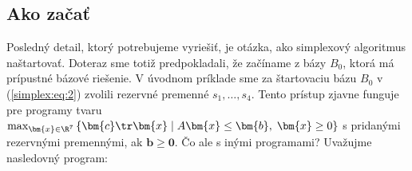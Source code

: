 \subsection*{Ako začať}

\noindent
Posledný detail, ktorý potrebujeme vyriešiť, je otázka, ako simplexový algoritmus naštartovať. Doteraz sme totiž predpokladali,
že začíname z bázy $B_0$, ktorá má prípustné bázové riešenie. 
V úvodnom príklade 
sme za štartovaciu bázu $B_0$ v
(\ref{simplex:eq:2}) zvolili rezervné premenné $s_1,\ldots,s_4$. Tento prístup
zjavne funguje pre programy tvaru 
$\max_{\bm{x}\in\R^7}\left\{ \bm{c}\tr\bm{x} \mid A\bm{x}\le\bm{b},\; \bm{x}\ge0
\right\}$ s pridanými rezervnými premennými,
 ak $\bm{b}\ge\bm{0}$. Čo ale s inými programami?
Uvažujme nasledovný program:


\renewcommand{\commonii}{%
  \draw (-0.5,0) -- coordinate (x axis mid) (1.5,0);
  \draw (0,-0.2) -- coordinate (y axis mid) (0,1.5);
  \foreach \x in {-0.2,-0.1,...,1.4}
      \draw (\x,1pt) -- (\x,-3pt);
  \draw (1,-3pt) node[anchor=north] {1};

  \foreach \y in {0.2,0.3,...,1.4}
      \draw (1pt,\y) -- (-3pt,\y);
  \draw (-1pt,1) node[anchor=east] {1}; 
  
  \draw (0,-3pt) node[anchor=north east]{$0$};
}


\renewcommand{\axes}{
    \draw
      (0,0,0) -- (1.5,0,0) node[anchor=north east]{$x$}
      (0,0,0) -- (0,1.5,0) node[anchor=north west]{$y$}
      (0,0,0) -- (0,0,1.5) node[anchor=south]{$s$};
}


